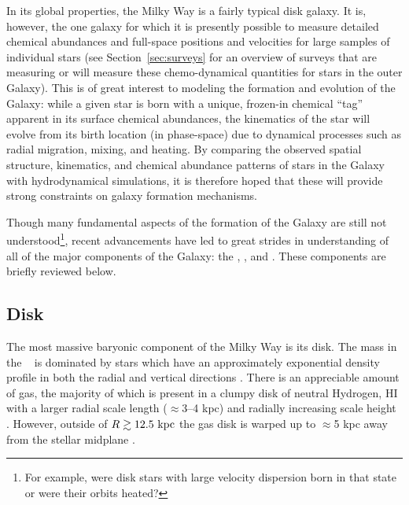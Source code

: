 In its global properties, the Milky Way is a fairly typical disk galaxy. It is,
however, the one galaxy for which it is presently possible to measure detailed
chemical abundances and full-space positions and velocities for large samples of
individual stars (see Section~\ref{sec:surveys} for an overview of surveys that
are measuring or will measure these chemo-dynamical quantities for stars in the
outer Galaxy). This is of great interest to modeling the formation and evolution
of the Galaxy: while a given star is born with a unique, frozen-in chemical
``tag'' apparent in its surface chemical abundances, the kinematics of the star
will evolve from its birth location (in phase-space) due to dynamical processes
such as radial migration, mixing, and heating. By comparing the observed spatial
structure, kinematics, and chemical abundance patterns of stars in the Galaxy
with hydrodynamical simulations, it is therefore hoped that these will provide
strong constraints on galaxy formation mechanisms.

Though many fundamental aspects of the formation of the Galaxy are still not
understood\footnote{For example, were disk stars with large velocity dispersion
born in that state or were their orbits heated?}, recent advancements have led
to great strides in understanding of all of the major components of the Galaxy:
the \mwdisk, \mwbulge, and \mwhalo. These components are briefly reviewed below.

\subsection{Disk}

The most massive baryonic component of the Milky Way is its disk. The mass in
the \mwdisk\ \citep[$M_d \approx 5 \times 10^{10}~\msun$;][]{mcmillan11} is
dominated by stars which have an approximately exponential density profile in
both the radial and vertical directions \citep[with scale lengths of $\approx$2
--3 kpc and $\approx$250--800 pc, respectively, from thin to thick
disk;][]{ojha01, juric08, mcmillan11, bovy12-spatialMAP}. There is an
appreciable amount of gas, the majority of which is present in a clumpy disk of
neutral Hydrogen, HI \citep[$M_{\rm HI} \approx 8 \times
10^9~\msun$;][]{kalberla09} with a larger radial scale length ($\approx$3--4
kpc) and radially increasing scale height \citep[$\approx$100 pc at $R=8~\kpc$
to $\approx$1 kpc at $R=25~\kpc$;][]{wouterloot90, merrifield92}. However,
outside of $R \gtrsim 12.5~\mathrm{kpc}$ the gas disk is warped up to $\approx$5 kpc
away from the stellar midplane \citep{henderson82, kalberla07}.


